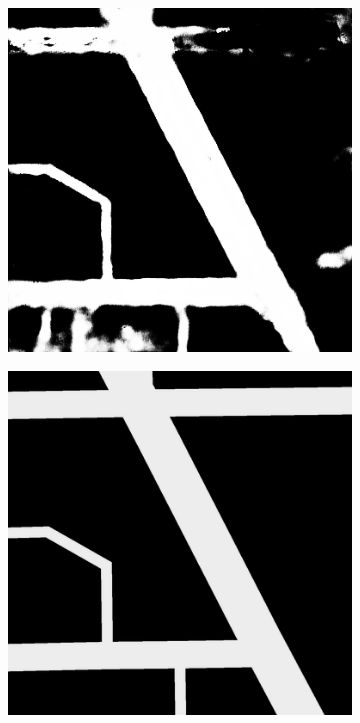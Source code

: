 \documentclass[10pt,conference,compsocconf]{IEEEtran}
\begin{document}
\begin{figure}[ht]
\begin{subfigure}{0.20\linewidth}
    \end{subfigure}
    \begin{subfigure}{0.20\linewidth}
        \centering
        \includegraphics[width=0.9\linewidth]{doc/images/shadow_unet.png}
    \end{subfigure}
    \begin{subfigure}{0.20\linewidth}
        \centering
        \includegraphics[width=0.9\linewidth]{doc/images/shadow_gt.png}
    \end{subfigure} \\
    

\end{figure}
\end{document}
